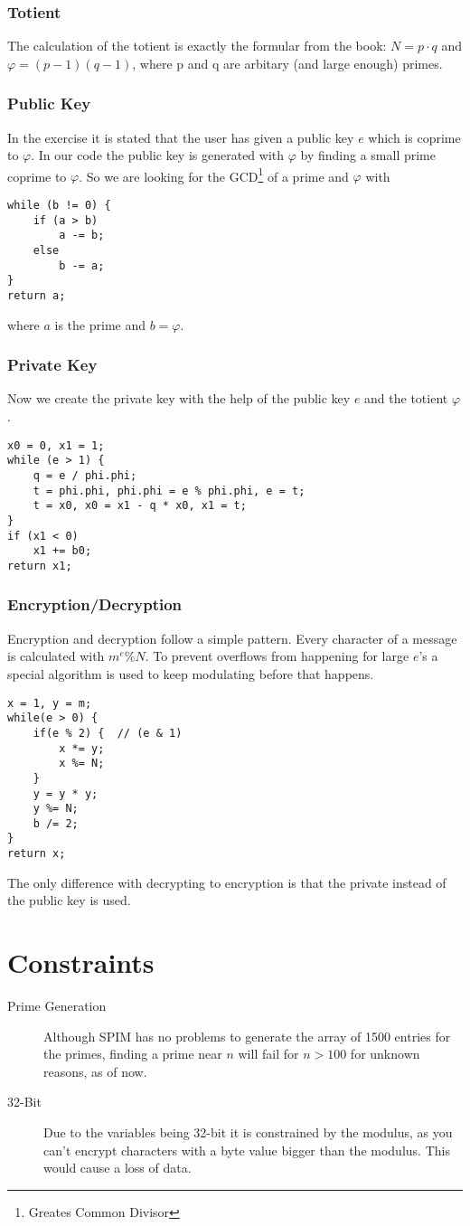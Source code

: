 \documentclass{report}
\begin{document}
\subsubsection{Totient}
The calculation of the totient is exactly the formular from the book: $N = p \cdot q$ and $\varphi = (p - 1)(q - 1)$, where p and q are arbitary (and large enough) primes.
\subsubsection{Public Key}
In the exercise it is stated that the user has given a public key $e$ which is coprime to $\varphi$. In our code the public key is generated with $\varphi$ by finding a small prime coprime to $\varphi$. So we are looking for the GCD\footnote{Greates Common Divisor} of a prime and $\varphi$ with
\begin{lstlisting}
while (b != 0) {
	if (a > b)
		a -= b;
	else
		b -= a;
}
return a;
\end{lstlisting}
where $a$ is the prime and $b=\varphi$.
\subsubsection{Private Key}
Now we create the private key with the help of the public key $e$ and the totient $\varphi$.
\begin{lstlisting}
x0 = 0, x1 = 1;
while (e > 1) {
	q = e / phi.phi;
	t = phi.phi, phi.phi = e % phi.phi, e = t;
	t = x0, x0 = x1 - q * x0, x1 = t;
}
if (x1 < 0)
	x1 += b0;
return x1;
\end{lstlisting}
\subsubsection{Encryption/Decryption}
Encryption and decryption follow a simple pattern. Every character of a message is calculated with $m^e\%N$. To prevent overflows from happening for large $e$'s a special algorithm is used to keep modulating before that happens.
\begin{lstlisting}
x = 1, y = m;
while(e > 0) {
	if(e % 2) {  // (e & 1)
		x *= y;
		x %= N;
	}
	y = y * y;
	y %= N;
	b /= 2;
}
return x;
\end{lstlisting}
The only difference with decrypting to encryption is that the private instead of the public key is used.
\section{Constraints}
\begin{description}
	\item[Prime Generation] Although SPIM has no problems to generate the array of 1500 entries for the primes, finding a prime near $n$ will fail for $n>100$ for unknown reasons, as of now.
	\item[32-Bit] Due to the variables being 32-bit it is constrained by the modulus, as you can't encrypt characters with a byte value bigger than the modulus. This would cause a loss of data.
\end{description}
\end{document}
